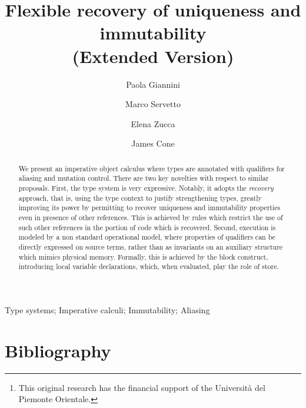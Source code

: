 \documentclass[preprint]{elsarticle}
\begin{document}
\begin{frontmatter}

\title{{Flexible recovery of uniqueness and immutability\\
(Extended Version)}}


\author[pg]{Paola Giannini}

\author[ms]{Marco Servetto}

\author[ez]{Elena Zucca}

\author[ms]{James Cone}




\address[ms]{School of Engineering and Computer Science, Victoria University of Wellington, Gate 6, Kelburn Parade
Wellington, New Zealand}
\address[pg]{Computer Science Institute, DiSIT, Universit\`a del Piemonte Orientale, viale Teresa Michel 11,  Alessandria, Italy\footnote{This original research has the financial support of the Universit\`a  del Piemonte Orientale.}
}
\address[ez]{DIBRIS, Universit\`a di Genova, Via Dodecaneso 35, Genova, Italy}
 
\begin{abstract}
We present an imperative object calculus where types are annotated with qualifiers for aliasing {and mutation} control.  There are two key novelties with respect to similar proposals. {First, the type system is very expressive. Notably, it adopts the \emph{recovery} approach, that is, using the
type context to justify strengthening types, greatly improving its power by permitting to recover uniqueness and immutability properties even in presence of other references. This is achieved by rules which restrict the use of such other references in the portion of code which is recovered.  Second, execution is modeled by a non standard operational model, where} 
properties of qualifiers can be directly expressed on source terms, rather than as invariants on an auxiliary structure which mimics physical memory. Formally, this is achieved by the block construct, introducing local variable declarations, which, when evaluated, play the role of store.
\end{abstract}


\begin{keyword}
{Type systems; Imperative calculi; Immutability; Aliasing}
\end{keyword}
\end{frontmatter}











\section*{Bibliography}




\end{document}
